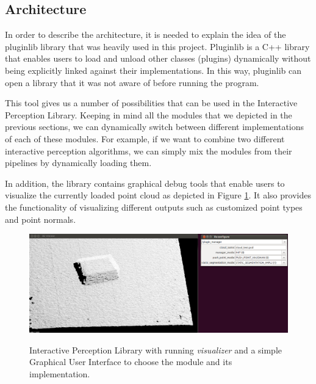 \subsection{Architecture}

In order to describe the architecture, it is needed to explain the idea of the pluginlib library that was heavily used in this project. Pluginlib is a C++ library that enables users to load and unload other classes (plugins) dynamically without being explicitly linked against their implementations. In this way, pluginlib can open a library that it was not aware of before running the program. 

This tool gives us a number of possibilities that can be used in the Interactive Perception Library. Keeping in mind all the modules that we depicted in the previous sections, we can dynamically switch between different implementations of each of these modules. For example, if we want to combine two different interactive perception algorithms, we can simply mix the modules from their pipelines by dynamically loading them. 

In addition, the library contains graphical debug tools that enable users to visualize the currently loaded point cloud as depicted in Figure \ref{fig:ipl}. It also provides the functionality of visualizing different outputs such as customized point types and point normals.

\begin{figure}

{\includegraphics[width=1.1\columnwidth]{figures/ipl.png}}

\caption{Interactive Perception Library with running \textit{visualizer} and a simple Graphical User Interface to choose the module and its implementation.}
\label{fig:ipl}
\end{figure}

